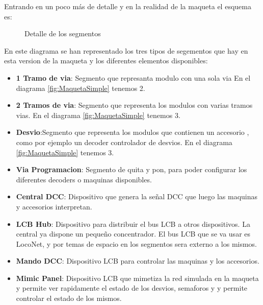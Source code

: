 
Entrando en un poco más de detalle y en la realidad de la maqueta
el esquema es:

\begin{figure}[H]
    \centering
    
    \caption{Detalle de los segmentos}
    \label{fig:SegmentosDetail}
\end{figure}
En este diagrama se han representado los tres tipos de segementos que hay
en esta version de la maqueta y los diferentes elementos disponibles:
\begin{itemize}
    \item \textbf{1 Tramo de via}: Segmento que represanta modulo con una sola via
En el diagrama \ref{fig:MaquetaSimple} tenemos 2.
    \item \textbf{2 Tramos de via}: Segmento que representa los modulos con varias
tramos vias. En el diagrama \ref{fig:MaquetaSimple} tenemos 3.
    \item \textbf{Desvio}:Segmento que representa los modulos que contienen un accesorio
, como por ejemplo un decoder controlador de desvios. En el diagrama \ref{fig:MaquetaSimple} tenemos 3.
    \item \textbf{Via Programacion}: Segmento de quita y pon, para poder
configurar los diferentes decoders o maquinas disponibles.
    \item \textbf{Central DCC}: Dispositivo que genera la señal DCC
que luego las maquinas y accesorios interpretan.
    \item \textbf{LCB Hub}: Dispositivo para distribuir el bus 
LCB a otros dispositivos. La central ya dispone un pequeño concentrador.
El bus LCB que se va usar es LocoNet, y por temas de espacio en los segmentos
sera externo a los mismos.
    \item \textbf{Mando DCC}: Dispositivo LCB para controlar las maquinas
y los accesorios.
    \item \textbf{Mimic Panel}: Dispositivo LCB que mimetiza la red simulada
en la maqueta y permite ver rapidamente el estado de los desvios, semaforos y
y permite controlar el estado de los mismos.
\end{itemize}
